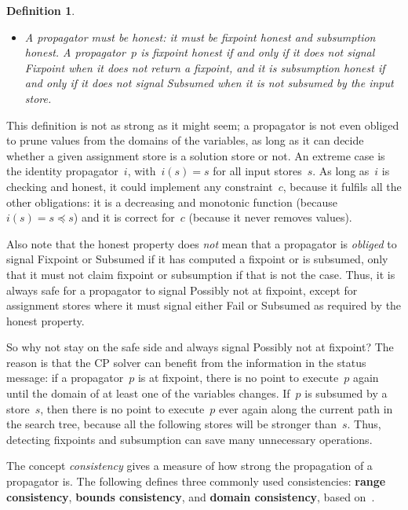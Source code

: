 \documentclass[a4paper,11pt]{article}
\newtheorem{definition}{Definition}
\newcommand{\CTpaper}[0]{DBLP:conf/cp/DemeulenaereHLP16}
\numberwithin{equation}{section}
\begin{document}
\begin{definition}
\begin{itemize}
  \item A propagator must be \emph{honest}: it must be 
    fixpoint honest and subsumption honest. 
    A propagator~$p$ is \emph{fixpoint honest} if and only if it does not signal 
    \emph{Fixpoint} when it does not return a fixpoint, and it is
    \emph{subsumption honest} if and only if it does
    not signal \emph{Subsumed} when it is not subsumed by the input store.
    
\end{itemize}

\end{definition}
This definition is not as strong as it might seem; a propagator is not even
obliged to prune values from the domains of the variables,
as long as it can decide whether a given
assignment store is a solution store or not.
An extreme case is the identity propagator~$i$, with~$i(s) = s$ for all input stores~$s$.
As long as~$i$ is checking and honest, it could implement any constraint~$c$,
because it fulfils all the other obligations: it is a decreasing and monotonic function
(because~$i(s) = s \preceq s$) and it is correct for~$c$
(because it never removes values).

Also note that the honest property does \emph{not} mean that a
propagator is \emph{obliged} to signal Fixpoint or Subsumed
if it has computed a fixpoint or is subsumed, only that it must not 
claim fixpoint or subsumption if that is not the case.
Thus, it is always safe 
for a propagator to signal Possibly not at fixpoint, except for
assignment stores where it must signal either Fail or Subsumed
as required by the honest property. 

So why not stay on the safe side and always signal Possibly not at fixpoint?
The reason is that the CP solver can benefit from the information
in the status message: if a propagator~$p$ is at fixpoint, there is no point to
execute~$p$ again until the domain of at least one of the variables changes.
If~$p$ is subsumed by a store~$s$, then there is no point to execute~$p$
ever again along the current path in the search tree, because all the following
stores will be stronger than~$s$. Thus, detecting fixpoints and subsumption
can save many unnecessary operations.

The concept \emph{consistency} gives a measure of how strong
the propagation of a propagator is.
The following defines three commonly used consistencies:
\textbf{range consistency}, \textbf{bounds consistency},
and \textbf{domain consistency}, based on~\cite{Bessiere06,\CTpaper}.
\end{document}
